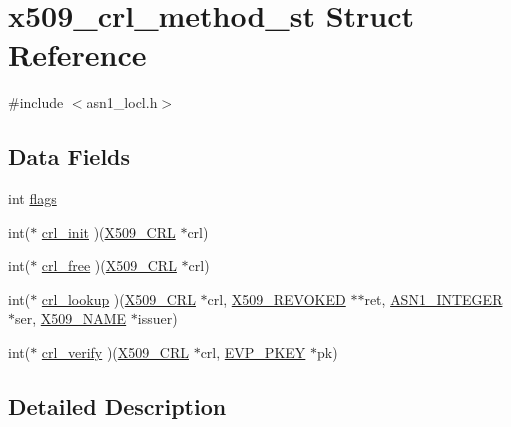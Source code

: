 \hypertarget{structx509__crl__method__st}{}\section{x509\+\_\+crl\+\_\+method\+\_\+st Struct Reference}
\label{structx509__crl__method__st}


{\ttfamily \#include $<$asn1\+\_\+locl.\+h$>$}

\subsection*{Data Fields}
\begin{DoxyCompactItemize}
\item 
int \hyperlink{structx509__crl__method__st_ac8bf36fe0577cba66bccda3a6f7e80a4}{flags}
\item 
int($\ast$ \hyperlink{structx509__crl__method__st_ac05b012a3a4d030d014dc6f0a7e923c2}{crl\+\_\+init} )(\hyperlink{crypto_2ossl__typ_8h_ac8661d2485c2c8da5fd7dd26b846f4bf}{X509\+\_\+\+C\+RL} $\ast$crl)
\item 
int($\ast$ \hyperlink{structx509__crl__method__st_ac9f021c0c75991a0e922b8e37905bda4}{crl\+\_\+free} )(\hyperlink{crypto_2ossl__typ_8h_ac8661d2485c2c8da5fd7dd26b846f4bf}{X509\+\_\+\+C\+RL} $\ast$crl)
\item 
int($\ast$ \hyperlink{structx509__crl__method__st_a09f09b17b8e24b9d14fae92c904d0c55}{crl\+\_\+lookup} )(\hyperlink{crypto_2ossl__typ_8h_ac8661d2485c2c8da5fd7dd26b846f4bf}{X509\+\_\+\+C\+RL} $\ast$crl, \hyperlink{crypto_2ossl__typ_8h_a7acf7587e6ca6c321a6d017c2f36ac4e}{X509\+\_\+\+R\+E\+V\+O\+K\+ED} $\ast$$\ast$ret, \hyperlink{crypto_2ossl__typ_8h_af4335399bf9774cb410a5e93de65998b}{A\+S\+N1\+\_\+\+I\+N\+T\+E\+G\+ER} $\ast$ser, \hyperlink{crypto_2ossl__typ_8h_a5c5fc036757e87b9bd163d0221696533}{X509\+\_\+\+N\+A\+ME} $\ast$issuer)
\item 
int($\ast$ \hyperlink{structx509__crl__method__st_ade102d65cd078d3fe83307c02f142670}{crl\+\_\+verify} )(\hyperlink{crypto_2ossl__typ_8h_ac8661d2485c2c8da5fd7dd26b846f4bf}{X509\+\_\+\+C\+RL} $\ast$crl, \hyperlink{crypto_2ossl__typ_8h_a2fca4fef9e4c7a2a739b1ea04acb56ce}{E\+V\+P\+\_\+\+P\+K\+EY} $\ast$pk)
\end{DoxyCompactItemize}


\subsection{Detailed Description}


